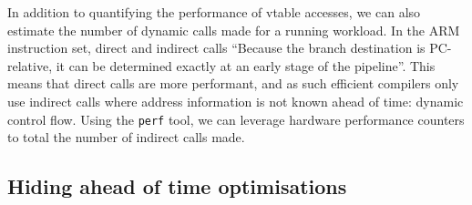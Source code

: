 
In addition to quantifying the performance of \ac{vtable} accesses, we can also estimate the number of dynamic calls made for a running workload.
In the ARM instruction set, direct and indirect calls \cite{armlimitedARMCortexRSeries}
``Because the branch destination is PC-relative, it can be determined exactly at an early stage of the pipeline''. This means that direct calls are more performant, and as such efficient compilers only use indirect calls where address information is not known ahead of time: dynamic control flow.
Using the \texttt{perf} tool, we can leverage hardware performance counters to total the number of indirect calls made.



\subsection{Hiding ahead of time optimisations}












